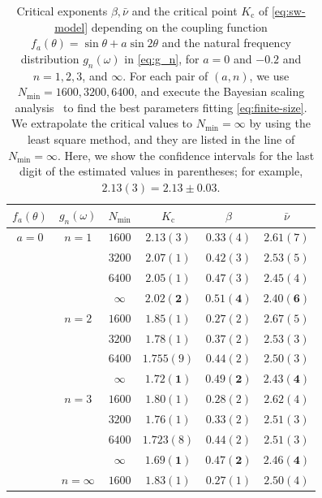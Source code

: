 \begin{table}[t]
  \begin{center}
    \caption{Critical exponents $\beta,\bar{\nu}$ and the critical point $K_{\mathrm{c}}$ of \eqref{eq:sw-model} depending on the coupling function $f_{a}(\theta)=\sin\theta+a\sin2\theta$ and the natural frequency distribution $g_{n}(\omega)$ in \eqref{eq:g_n}, for $a=0$ and $-0.2$ and $n=1,2,3$, and $\infty$.
    For each pair of $(a,n)$, we use $N_{\min}=1600,3200,6400$, and execute the Bayesian scaling analysis~\cite{harada2011} to find the best parameters fitting \eqref{eq:finite-size}.
    We extrapolate the critical values to $N_{\min}=\infty$ by using the least square method,
    and they are listed in the line of $N_{\min}=\infty$.
    Here, we show the confidence intervals for the last digit of the estimated values 
    in parentheses; for example, $2.13(3)=2.13\pm0.03$.
  }
    \label{table:parameter-estimate}
    \begin{tabular*}{\linewidth}{@{\extracolsep{\fill}}cccccc}\hline
      $f_{a}(\theta)$ & $g_{n}(\omega)$ & $N_{\min}$ & $K_{\mathrm{c}}$ & $\beta$ & $\bar{\nu}$ \\\hline\hline
      $a=0$ & $n=1$ & $1600$ & $2.13(3)$ & $0.33(4)$ & $2.61(7)$ \\
       & & $3200$ & $2.07(1)$ & $0.42(3)$ & $2.53(5)$ \\
       & & $6400$ & $2.05(1)$ & $0.47(3)$ & $2.45(4)$ \\
       & & $\mathbf{\infty}$ & $\mathbf{2.02(2)}$ & $\mathbf{0.51(4)}$ & $\mathbf{2.40(6)}$ \\\cline{2-6}
       & $n=2$ & $1600$ & $1.85(1)$ & $0.27(2)$ & $2.67(5)$\\
       & & $3200$ & $1.78(1)$ & $0.37(2)$ & $2.53(3)$\\
       & & $6400$ & $1.755(9)$ & $0.44(2)$ & $2.50(3)$\\
       & & $\mathbf{\infty}$ & $\mathbf{1.72(1)}$ & $\mathbf{0.49(2)}$ & $\mathbf{2.43(4)}$ \\\cline{2-6}
       & $n=3$ & $1600$ & $1.80(1)$ & $0.28(2)$ & $2.62(4)$\\
       & & $3200$ & $1.76(1)$ & $0.33(2)$ & $2.51(3)$\\
       & & $6400$ & $1.723(8)$ & $0.44(2)$ & $2.51(3)$\\
       & & $\mathbf{\infty}$ & $\mathbf{1.69(1)}$ & $\mathbf{0.47(2)}$ & $\mathbf{2.46(4)}$ \\\cline{2-6}
       & $n=\infty$ & $1600$ & $1.83(1)$ & $0.27(1)$ & $2.50(4)$ \\

\end{tabular*}
\end{center}
\end{table}
